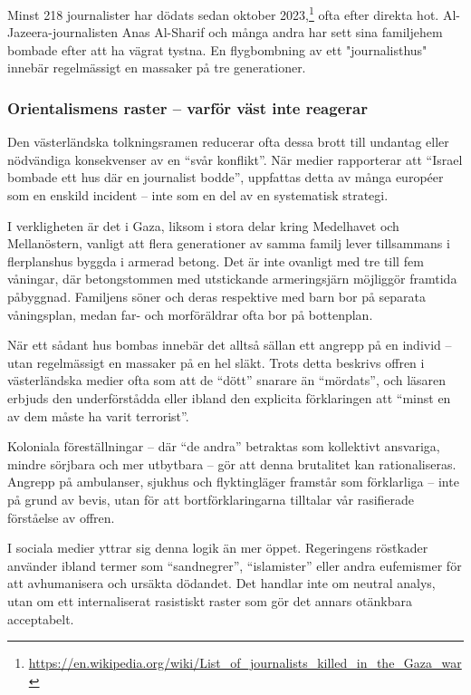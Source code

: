 Minst 218 journalister har dödats sedan oktober 2023,\footnote{\url{https://en.wikipedia.org/wiki/List_of_journalists_killed_in_the_Gaza_war}} ofta efter direkta hot. Al-Jazeera-journalisten Anas Al-Sharif och många andra har sett sina familjehem bombade efter att ha vägrat tystna. En flygbombning av ett "journalisthus" innebär regelmässigt en massaker på tre generationer.

\subsubsection*{Orientalismens raster – varför väst inte reagerar}
Den västerländska tolkningsramen reducerar ofta dessa brott till undantag eller nödvändiga konsekvenser av en \enquote{svår konflikt}. När medier rapporterar att \enquote{Israel bombade ett hus där en journalist bodde}, uppfattas detta av många européer som en enskild incident – inte som en del av en systematisk strategi.

I verkligheten är det i Gaza, liksom i stora delar kring Medelhavet och Mellanöstern, vanligt att flera generationer av samma familj lever tillsammans i flerplanshus byggda i armerad betong. Det är inte ovanligt med tre till fem våningar, där betongstommen med utstickande armeringsjärn möjliggör framtida påbyggnad. Familjens söner och deras respektive med barn bor på separata våningsplan, medan far- och morföräldrar ofta bor på bottenplan.

När ett sådant hus bombas innebär det alltså sällan ett angrepp på en individ – utan regelmässigt en massaker på en hel släkt. Trots detta beskrivs offren i västerländska medier ofta som att de \enquote{dött} snarare än \enquote{mördats}, och läsaren erbjuds den underförstådda eller ibland den explicita förklaringen att \enquote{minst en av dem måste ha varit terrorist}.

Koloniala föreställningar – där \enquote{de andra} betraktas som kollektivt ansvariga, mindre sörjbara och mer utbytbara – gör att denna brutalitet kan rationaliseras. Angrepp på ambulanser, sjukhus och flyktingläger framstår som förklarliga – inte på grund av bevis, utan för att bortförklaringarna tilltalar vår rasifierade förståelse av offren.

I sociala medier yttrar sig denna logik än mer öppet. Regeringens röstkader använder ibland termer som \enquote{sandnegrer}, \enquote{islamister} eller andra eufemismer för att avhumanisera och ursäkta dödandet. Det handlar inte om neutral analys, utan om ett internaliserat rasistiskt raster som gör det annars otänkbara acceptabelt.

